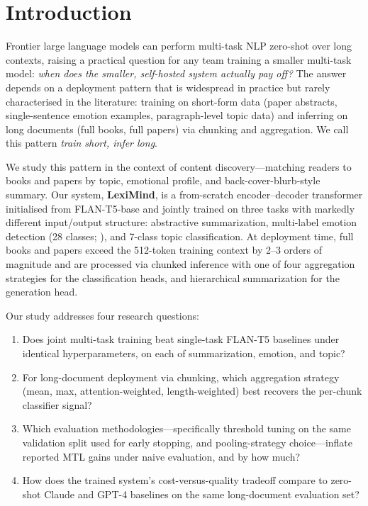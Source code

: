\documentclass[11pt]{article}
\begin{document}
\section{Introduction}

Frontier large language models \citep{openai2023gpt4, anthropic2024claude} can perform multi-task NLP zero-shot over long contexts, raising a practical question for any team training a smaller multi-task model: \textit{when does the smaller, self-hosted system actually pay off?} The answer depends on a deployment pattern that is widespread in practice but rarely characterised in the literature: training on short-form data (paper abstracts, single-sentence emotion examples, paragraph-level topic data) and inferring on long documents (full books, full papers) via chunking and aggregation. We call this pattern \textit{train short, infer long}.

We study this pattern in the context of content discovery---matching readers to books and papers by topic, emotional profile, and back-cover-blurb-style summary. Our system, \textbf{LexiMind}, is a from-scratch encoder--decoder transformer initialised from FLAN-T5-base \citep{chung2022scaling} and jointly trained on three tasks with markedly different input/output structure: abstractive summarization, multi-label emotion detection (28 classes; \citealt{demszky2020goemotions}), and 7-class topic classification. At deployment time, full books and papers exceed the 512-token training context by 2--3 orders of magnitude and are processed via chunked inference with one of four aggregation strategies for the classification heads, and hierarchical summarization for the generation head.

Our study addresses four research questions:

\begin{enumerate}
    \item[\textbf{RQ1}] Does joint multi-task training beat single-task FLAN-T5 baselines under identical hyperparameters, on each of summarization, emotion, and topic?
    \item[\textbf{RQ2}] For long-document deployment via chunking, which aggregation strategy (mean, max, attention-weighted, length-weighted) best recovers the per-chunk classifier signal?
    \item[\textbf{RQ3}] Which evaluation methodologies---specifically threshold tuning on the same validation split used for early stopping, and pooling-strategy choice---inflate reported MTL gains under naive evaluation, and by how much?
    \item[\textbf{RQ4}] How does the trained system's cost-versus-quality tradeoff compare to zero-shot Claude and GPT-4 baselines on the same long-document evaluation set?
\end{enumerate}
\end{document}

